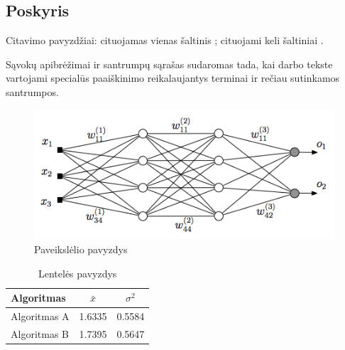 \documentclass[
]{VUMIFPSkursinis}
\begin{document}
\subsection{Poskyris}
Citavimo pavyzdžiai: cituojamas vienas šaltinis \cite{PvzStraipsnLt}; cituojami
keli šaltiniai \cite{Kavitha2022, PvzStraipsnLta, PvzKonfLt, PvzKonfEn, PvzKnygLt, PvzKnygEn,
PvzElPubLt, PvzElPubEn, PvzBakLt, PvzMagistrLt, PvzPhdEn}.

\printbibliography  %

Sąvokų apibrėžimai ir santrumpų sąrašas sudaromas tada, kai darbo tekste
vartojami specialūs paaiškinimo reikalaujantys terminai ir rečiau sutinkamos
santrumpos.


\begin{figure}[H]
    \centering
    \includegraphics[scale=0.5]{img/MLP}
    \caption{Paveikslėlio pavyzdys}
    \label{img:mlp}
\end{figure}



\begin{table}[H]\footnotesize
  \centering
  \caption{Lentelės pavyzdys}
  {\begin{tabular}{|l|c|c|} \hline
    Algoritmas & $\bar{x}$ & $\sigma^{2}$ \\
    \hline
    Algoritmas A  & 1.6335    & 0.5584       \\
    Algoritmas B  & 1.7395    & 0.5647       \\
    \hline
  \end{tabular}}
  \label{tab:table example}
\end{table}
\end{document}

